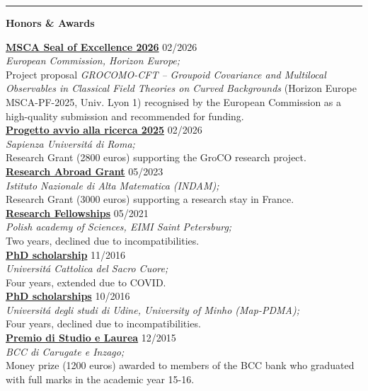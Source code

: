 \documentclass[a4paper]{article}
\newcommand{\block}[1]{\hrule \vspace{0.2cm} \textbf{\Large #1} \vspace{0.2cm}}
\newcommand{\voice}[5]{\href{#4}{\textbf{#1}} \hfill #2 \\ \textit{#3} \\ {\small #5} \vspace{0.2cm} \\}
\begin{document}

	\block{Honors \& Awards}

    
    \voice{MSCA Seal of Excellence 2026}
        {02/2026}
        {European Commission, Horizon Europe;}
        {https://www.dropbox.com/scl/fi/zr05hlqz8rpq4d9j51b7q/2602-MSCA-SealofExcellence.pdf?rlkey=ovu5ad8hmdjh9nkaqy8rmq3lb&st=wbag5jwb&dl=0}       
        {Project proposal \emph{GROCOMO-CFT – Groupoid Covariance and Multilocal Observables in Classical Field Theories on Curved Backgrounds} (Horizon Europe MSCA-PF-2025, Univ. Lyon 1) recognised by the European Commission as a high-quality submission and recommended for funding.}
    \voice{Progetto avvio alla ricerca 2025}
        {02/2026}
        {Sapienza Universit\'a di Roma;}
        {https://research.uniroma1.it/cerca/irisap/SAP_RICERCA_2025_GROCO_MITI_A_01?anno=&tipo=&area=&title=groupoid&structure=&form_build_id=form-DBnmXGkJc8k86RbACkhHb-lwkkcooJaQmzI4238724Q&form_token=wq-Z-8duVSxCLFAB2wdHYw-dmNiRB4ijekxP1jC28B8&form_id=irisap_search_form&op=Cerca}       
        {Research Grant (2800 euros) supporting the GroCO research project.}
	\voice{Research Abroad Grant}
		{05/2023}
		{Istituto Nazionale di Alta Matematica (INDAM);}
		{https://www.altamatematica.it/wp-content/uploads/2022/12/bando-estero-2022-2023-1.pdf}       
		{Research Grant (3000 euros) supporting a research stay in France.}
	\voice{Research Fellowships}
		{05/2021}
		{Polish academy of Sciences, EIMI Saint Petersburg;}
		{}       
		{Two years, declined due to incompatibilities.}
	\voice{PhD scholarship}
		{11/2016}
		{Universit\'a Cattolica del Sacro Cuore;}
		{https://www.dropbox.com/s/pmsg20xsxd6x5yf/External_Scholarship.pdf?dl=0}       
		{Four years, extended due to COVID.}
	\voice{PhD scholarships}
		{10/2016}
		{Universit\'a degli studi di Udine, University of Minho (Map-PDMA);}
		{}       
		{Four years, declined due to incompatibilities.}
	\voice{Premio di Studio e Laurea}
		{12/2015}
		{BCC di Carugate e Inzago;}
		{https://web.archive.org/web/20191207203437/https://www.bccmilano.it/news/dettaglio_news_div.asp?i_menuID=54872&hNewsID=132411}       
		{Money prize (1200 euros) awarded to members of the BCC bank who graduated with full marks in the academic year 15-16.}
\end{document}
